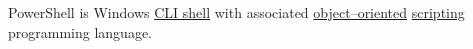 \label{powershell}
PowerShell is Windows \hyperref[shellcligui]{CLI shell} with associated \hyperref[objectorientedprogramming]{object--oriented} \hyperref[scriptinglanguages]{scripting} programming language.

